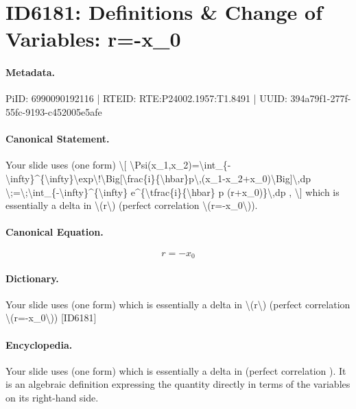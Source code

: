 \section*{ID6181: Definitions \& Change of Variables: r=-x\_0}
\paragraph{Metadata.}
PiID: 6990090192116 | RTEID: RTE:P24002.1957:T1.8491 | UUID: 394a79f1-277f-55fc-9193-c452005e5afe

\paragraph{Canonical Statement.}
Your slide uses (one form) \textbackslash{}[ \textbackslash{}Psi(x\_1,x\_2)=\textbackslash{}int\_\{-\textbackslash{}infty\}\textasciicircum{}\{\textbackslash{}infty\}\textbackslash{}exp\textbackslash{}!\textbackslash{}Big[\textbackslash{}frac\{i\}\{\textbackslash{}hbar\}p\textbackslash{},(x\_1-x\_2+x\_0)\textbackslash{}Big]\textbackslash{},dp \textbackslash{};=\textbackslash{};\textbackslash{}int\_\{-\textbackslash{}infty\}\textasciicircum{}\{\textbackslash{}infty\} e\textasciicircum{}\{\textbackslash{}tfrac\{i\}\{\textbackslash{}hbar\} p (r+x\_0)\}\textbackslash{},dp , \textbackslash{}] which is essentially a delta in \textbackslash{}(r\textbackslash{}) (perfect correlation \textbackslash{}(r=-x\_0\textbackslash{})).

\paragraph{Canonical Equation.}
\[
r=-x_0
\]

\paragraph{Dictionary.}
Your slide uses (one form) which is essentially a delta in \textbackslash{}(r\textbackslash{}) (perfect correlation \textbackslash{}(r=-x\_0\textbackslash{})) [ID6181]

\paragraph{Encyclopedia.}
Your slide uses (one form) which is essentially a delta in (perfect correlation ). It is an algebraic definition expressing the quantity directly in terms of the variables on its right-hand side.
